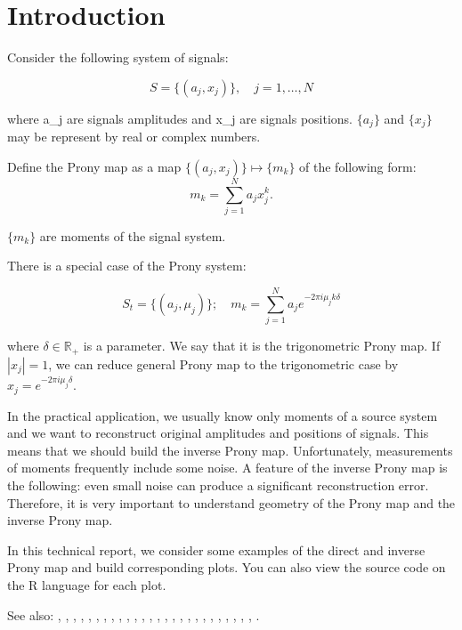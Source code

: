 \section{Introduction}

Consider the following system of signals:

$$
S = \{ (a_j, x_j) \}, \quad j = 1, \ldots , N
$$

where a_j are signals amplitudes and x_j are signals positions. $\{a_j\}$ and $\{x_j\}$ may be represent by real or complex numbers. \par

Define the Prony map as a map $\{ (a_j, x_j) \} \mapsto \{m_k\}$ of the following form:
$$
m_k = \sum_{j=1}^N a_j x_j^k.
$$
  
$\{m_k\}$ are moments of the signal system.

There is a special case of the Prony system:

$$
S_t = \{ (a_j, \mu_j) \}; \quad m_k = \sum_{j=1}^N a_j e^{-2\pi i \mu_j k \delta}
$$

where $\delta \in \mathbb{R}_+$ is a parameter. We say that it is the trigonometric Prony map. If $|x_j| = 1$, we can reduce general Prony map to the trigonometric case by $x_j = e^{-2\pi i \mu_j \delta}$.

In the practical application, we usually know only moments of a source system and we want to reconstruct original amplitudes and positions of signals. This means that we should build the inverse Prony map. Unfortunately, measurements of moments frequently include some noise. A feature of the inverse Prony map is the following: even small noise can produce a significant reconstruction error. Therefore, it is very important to understand geometry of the Prony map and the inverse Prony map.

In this technical report, we consider some examples of the direct and inverse Prony map and build corresponding plots. You can also view the source code on the R language for each plot.

See also: \cite{2015arXiv150206932A}, \cite{azais_spike}, \cite{batenkov_numerical_2014}, \cite{batenkov_accurate_2014}, \cite{Bat.Sar.Yom}, \cite{Bat.Yom2}, \cite{Bat.Yom.Sampta13}, \cite{Bat.Yom1}, \cite{candes_towards_2014}, \cite{candes_super-resolution_2013}, \cite{demanet_super-resolution_2013}, \cite{donoho_superresolution_1992}, \cite{Don1}, \cite{duval_exact_2013}, \cite{fernandez-granda_support_2013}, \cite{heckel_super-resolution_2014}, \cite{Lev.Ful}, \cite{liao_music_2014}, \cite{McC}, \cite{Min.Kaw.Min}, \cite{moitra_threshold_2014}, \cite{Ode.Bar.Pis}, \cite{Sle}, \cite{Yom2}, \cite{Yom1}, \cite{Dem.Ngu}, \cite{Mor.Can}.
  
  
  
  
  
  
  
  
  
  
  
  
  
  